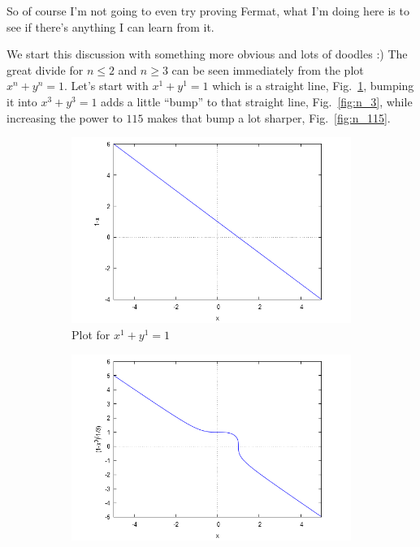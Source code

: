 \documentclass[aps,preprint,preprintnumbers,nofootinbib,showpacs,prd]{revtex4-1}
\begin{document}
So of course I'm not going to even try proving Fermat, what I'm doing here is to see if there's anything I can learn from it.

We start this discussion with something more obvious and lots of doodles :) The great divide for $n \le 2$ and $n \ge 3$ can be seen immediately from the plot $x^n + y^n = 1$. Let's start with $x^1 + y^1 = 1$ which is a straight line, Fig.~\ref{fig:n_1}, bumping it into $x^3 + y^3 = 1$ adds a little ``bump'' to that straight line, Fig.~\ref{fig:n_3}, while increasing the power to $115$ makes that bump a lot sharper, Fig.~\ref{fig:n_115}.
%
\begin{figure}
\centering
\begin{subfigure}{.33\textwidth}
  \centering
  \includegraphics[width=1.1\linewidth]{FLT_n_1.png}
  \caption{Plot for $x^1 + y^1 = 1$}
  \label{fig:n_1}
\end{subfigure}%
\begin{subfigure}{.33\textwidth}
  \centering
  \includegraphics[width=1.1\linewidth]{FLT_n_3.png}

\end{subfigure}
\end{figure}
\end{document}
